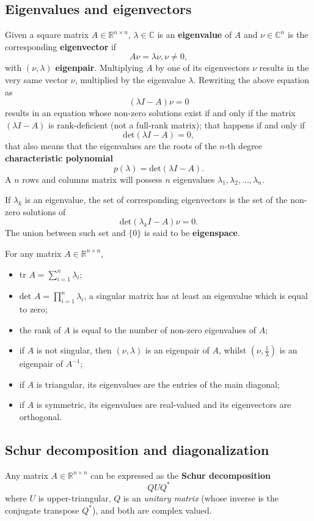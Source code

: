 \documentclass[10pt]{report}
\begin{document}
\subsection{Eigenvalues and eigenvectors}
\label{sec:orga19cc1a}
Given a square matrix \(A\in\mathbb{R}^{n \times n}\), \(\lambda \in \mathbb{C}\) is an \textbf{eigenvalue} of \(A\) and \(\nu \in \mathbb{C}^n\) is the corresponding \textbf{eigenvector} if $$A\nu = \lambda\nu, \nu\neq 0,$$ with \((\nu, \lambda)\) \textbf{eigenpair}. Multiplying \(A\) by one of its eigenvectors \(\nu\) results in the very same vector \(\nu\), multiplied by the eigenvalue \(\lambda\). Rewriting the above equation as $$(\lambda I - A)\nu = 0$$ results in an equation whose non\--zero solutions exist if and only if the matrix \((\lambda I - A)\) is rank\--deficient (not a full\--rank matrix); that happens if and only if $$\mbox{det}(\lambda I - A) = 0,$$ that also means that the eigenvalues are the roots of the \(n\mbox{-th}\) degree \textbf{characteristic polynomial} $$p(\lambda) = \mbox{det}(\lambda I - A).$$ A \(n\) rows and columns matrix will possess \(n\) eigenvalues \(\lambda_1, \lambda_2, \dots, \lambda_n\).

If \(\lambda_k\) is an eigenvalue, the set of corresponding eigenvectors is the set of the non\--zero solutions of $$\mbox{det}(\lambda_k I - A)\nu = 0.$$ The union between such set and \(\{0\}\) is said to be \textbf{eigenspace}.

For any matrix \(A\in\mathbb{R}^{n\times n}\),
\begin{itemize}
\item \(\mbox{tr }A = \sum_{i=1}^n \lambda_i\);
\item \(\mbox{det }A = \prod_{i=1}^n \lambda_i\), a singular matrix has at least an eigenvalue which is equal to zero;
\item the rank of \(A\) is equal to the number of non\--zero eigenvalues of \(A\);
\item if \(A\) is not singular, then \((\nu, \lambda)\) is an eigenpair of \(A\), whilst \((\nu, \frac{1}{\lambda})\) is an eigenpair of \(A^{-1}\);
\item if \(A\) is triangular, its eigenvalues are the entries of the main diagonal;
\item if \(A\) is symmetric, its eigenvalues are real\--valued and its eigenvectors are orthogonal.
\end{itemize}
\subsection{Schur decomposition and diagonalization}
\label{sec:org7a7adfe}
Any matrix \(A\in\mathbb{R}^{n \times n}\) can be expressed as the \textbf{Schur decomposition} $$QUQ^*$$ where \(U\) is upper\--triangular, \(Q\) is an \emph{unitary matrix} (whose inverse is the conjugate transpose \(Q^*\)), and both are complex valued.
\end{document}
